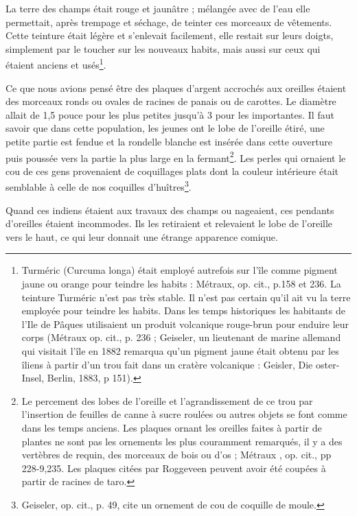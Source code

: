 \documentclass{article}
\begin{document}
        
    La terre des champs était rouge et jaunâtre ; mélangée avec de l'eau elle permettait, après trempage et séchage, de teinter ces morceaux de vêtements. Cette teinture était légère et s'enlevait facilement, elle restait sur leurs doigts, simplement par le toucher sur les nouveaux habits, mais aussi sur ceux qui étaient anciens et usés\footnote{Turméric (Curcuma longa) était employé autrefois sur l'île comme pigment jaune ou orange pour teindre les habits : Métraux, op. cit., p.158 et 236. La teinture Turméric n'est pas très stable. Il n'est pas certain qu'il ait vu la terre employée pour teindre les habits. Dans les temps historiques les habitants de l'Ile de Pâques utilisaient un produit volcanique rouge-brun pour enduire leur corps (Métraux op. cit., p. 236 ; Geiseler, un lieutenant de marine allemand qui visitait l'île en 1882 remarqua qu'un pigment jaune était obtenu par les îliens à partir d'un trou fait dans un cratère volcanique : Geisler, Die oster-Insel, Berlin, 1883, p 151).}.
            
        
    Ce que nous avions pensé être des plaques d'argent accrochés aux oreilles étaient des morceaux ronds ou ovales de racines de panais ou de carottes. Le diamètre allait de 1,5 pouce pour les plus petites jusqu'à 3 pour les importantes. Il faut savoir que dans cette population, les jeunes ont le lobe de l'oreille étiré, une petite partie est fendue et la rondelle blanche est insérée dans cette ouverture puis poussée vers la partie la plus large en la fermant\footnote{Le percement des lobes de l'oreille et l'agrandissement de ce trou par l'insertion de feuilles de canne à sucre roulées ou autres objets se font comme dans les temps anciens. Les plaques ornant les oreilles faites à partir de plantes ne sont pas les ornements les plus couramment remarqués, il y a des vertèbres de requin, des morceaux de bois ou d'os ; Métraux , op. cit., pp 228-9,235. Les plaques citées par Roggeveen peuvent avoir été coupées à partir de racines de taro.}. Les perles qui ornaient le cou de ces gens provenaient de coquillages plats dont la couleur intérieure était semblable à celle de nos coquilles d'huîtres\footnote{Geiseler, op. cit., p. 49, cite un ornement de cou de coquille de moule.}.
            
        
    Quand ces indiens étaient aux travaux des champs ou nageaient, ces pendants d'oreilles étaient incommodes. Ils les retiraient et relevaient le lobe de l'oreille vers le haut, ce qui leur donnait une étrange apparence comique.
            
\end{document}
